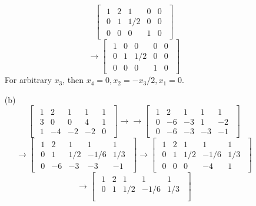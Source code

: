 \begin{description}
\begin{itemize}
$$\begin{bmatrix}
\begin{array}{cccc|c}
1 & 2 & 1 & 0 & 0 \\
0 & 1 & 1/2 & 0 & 0 \\
0 & 0 & 0 & 1 & 0
\end{array}
\end{bmatrix}$$
$$\rightarrow \begin{bmatrix}
\begin{array}{cccc|c}
1 & 0 & 0 & 0 & 0 \\
0 & 1 & 1/2 & 0 & 0 \\
0 & 0 & 0 & 1 & 0
\end{array}
\end{bmatrix}$$
For arbitrary $x_3$, then $x_4 = 0, x_2 = -x_3/2, x_1 = 0$.
\item[(b)]
$$\begin{bmatrix}
\begin{array}{cccc|c}
1 & 2 & 1 & 1 & 1 \\
3 & 0 & 0 & 4 & 1 \\
1 & -4 & -2 & -2 & 0
\end{array}
\end{bmatrix} \rightarrow\rightarrow \begin{bmatrix}
\begin{array}{cccc|c}
1 & 2 & 1 & 1 & 1 \\
0 & -6 & -3 & 1 & -2 \\
0 & -6 & -3 & -3 & -1
\end{array}
\end{bmatrix}$$
$$ \rightarrow \begin{bmatrix}
\begin{array}{cccc|c}
1 & 2 & 1 & 1 & 1 \\
0 & 1 & 1/2 & -1/6 & 1/3 \\
0 & -6 & -3 & -3 & -1
\end{array}
\end{bmatrix} \rightarrow \begin{bmatrix}
\begin{array}{cccc|c}
1 & 2 & 1 & 1 & 1 \\
0 & 1 & 1/2 & -1/6 & 1/3 \\
0 & 0 & 0 & -4 & 1
\end{array}
\end{bmatrix}$$
$$\rightarrow \begin{bmatrix}
\begin{array}{cccc|c}
1 & 2 & 1 & 1 & 1 \\
0 & 1 & 1/2 & -1/6 & 1/3 \\

\end{array}
\end{bmatrix}$$
\end{itemize}
\end{description}
